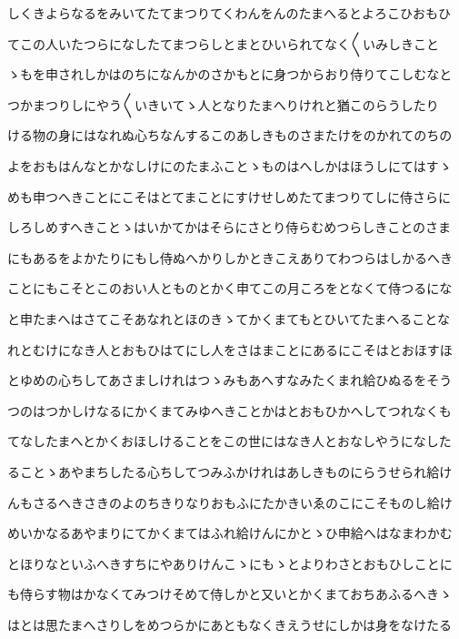 \documentclass[a4paper,11pt,landscape]{ltjtarticle}
\begin{document}
しくきよらなるをみいてたてまつりてくわんをんのたまへるとよろこひおもひ
\par\medskip
てこの人いたつらになしたてまつらしとまとひいられてなく〱いみしきこと
\par\medskip
ゝもを申されしかはのちになんかのさかもとに身つからおり侍りてこしむなと
\par\medskip
つかまつりしにやう〱いきいてゝ人となりたまへりけれと猶このらうしたり
\par\medskip
ける物の身にはなれぬ心ちなんするこのあしきものさまたけをのかれてのちの
\par\medskip
よをおもはんなとかなしけにのたまふことゝものはへしかはほうしにてはすゝ
\par\medskip
めも申つへきことにこそはとてまことにすけせしめたてまつりてしに侍さらに
\par\medskip
しろしめすへきことゝはいかてかはそらにさとり侍らむめつらしきことのさま
\par\medskip
にもあるをよかたりにもし侍ぬへかりしかときこえありてわつらはしかるへき
\par\medskip
ことにもこそとこのおい人とものとかく申てこの月ころをとなくて侍つるにな
\par\medskip
と申たまへはさてこそあなれとほのきゝてかくまてもとひいてたまへることな
\par\medskip
れとむけになき人とおもひはてにし人をさはまことにあるにこそはとおほすほ
\par\medskip
とゆめの心ちしてあさましけれはつゝみもあへすなみたくまれ給ひぬるをそう
\par\medskip
つのはつかしけなるにかくまてみゆへきことかはとおもひかへしてつれなくも
\par\medskip
てなしたまへとかくおほしけることをこの世にはなき人とおなしやうになした
\par\medskip
ることゝあやまちしたる心ちしてつみふかけれはあしきものにらうせられ給け
\par\medskip
んもさるへきさきのよのちきりなりおもふにたかきいゑのこにこそものし給け
\par\medskip
めいかなるあやまりにてかくまてはふれ給けんにかとゝひ申給へはなまわかむ
\par\medskip
とほりなといふへきすちにやありけんこゝにもゝとよりわさとおもひしことに
\par\medskip
も侍らす物はかなくてみつけそめて侍しかと又いとかくまておちあふるへきゝ
\par\medskip
はとは思たまへさりしをめつらかにあともなくきえうせにしかは身をなけたる
\par\medskip
\end{document}
